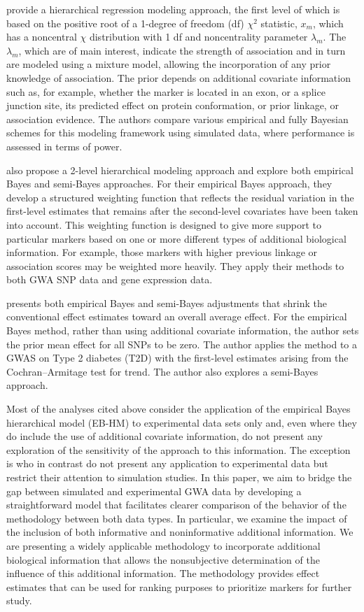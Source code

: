 \citet{Wahba:1990}
provide a hierarchical regression modeling approach, the first
level of which is based on the positive root of a 1-degree of
freedom (df) $\chi^2$ statistic, $x_m$, which has a noncentral
$\chi$ distribution with 1 df and noncentrality parameter
$\lambda_m$. The $\lambda_m$, which are of main interest,
indicate the strength of association and in turn are modeled
using a mixture model, allowing the incorporation of any prior
knowledge of association. The prior depends on additional
covariate information such as, for example, whether the marker
is located in an exon, or a splice junction site, its predicted
effect on protein conformation, or prior linkage, or association
evidence. The authors compare various empirical and fully
Bayesian schemes for this modeling framework using simulated
data, where performance is assessed in terms of power.

\citet{Brown:1989}
also propose a 2-level hierarchical modeling approach and explore
both empirical Bayes and semi-Bayes approaches. For their empirical
Bayes approach, they develop a structured weighting function
that reflects the residual variation in the first-level estimates
that remains after the second-level covariates have been taken
into account. This weighting function is designed to give more
support to particular markers based on one or more different
types of additional biological information. For example, those
markers with higher previous linkage or association scores may
be weighted more heavily. They apply their methods to both GWA
SNP data and gene expression data.

\citet{SAS_Institute:1999}
presents both empirical Bayes and semi-Bayes adjustments that
shrink the conventional effect estimates toward an overall
average effect. For the empirical Bayes method, rather than
using additional covariate information, the author sets the prior
mean effect for all SNPs to be zero. The author applies the
method to a GWAS on Type 2 diabetes (T2D) with the first-level
estimates arising from the Cochran--Armitage test for trend.
The author also explores a semi-Bayes approach.

Most of the analyses cited above consider the application of the
empirical Bayes hierarchical model (EB-HM) to experimental data
sets only and, even where they do include the use of additional
covariate information, do not present any exploration of the
sensitivity of the approach to this information. The exception is
\citet{Fimmers_Seuchter:1989}
who in contrast do not present any application to experimental
data but restrict their attention to simulation studies. In
this paper, we aim to bridge the gap between simulated and
experimental GWA data by developing a straightforward model
that facilitates clearer comparison of the behavior of the
methodology between both data types. In particular, we examine
the impact of the inclusion of both informative and
noninformative additional information. We are presenting a
widely applicable methodology to incorporate additional biological
information that allows the nonsubjective determination of the
influence of this additional information. The methodology provides
effect estimates that can be used for ranking purposes to
prioritize markers for further study.

